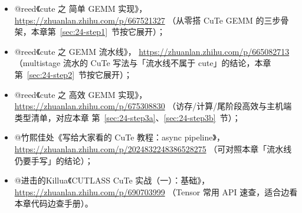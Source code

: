 \begin{itemize}
  \item @reed《cute 之 简单 GEMM 实现》，
        \url{https://zhuanlan.zhihu.com/p/667521327}
        （从零搭 CuTe GEMM 的三步骨架，本章第~\ref{sec:24-step1}~节按它展开）；
  \item @reed《cute 之 GEMM 流水线》，
        \url{https://zhuanlan.zhihu.com/p/665082713}
        （multistage 流水的 CuTe 写法与「流水线不属于 cute」的结论，本章
        第~\ref{sec:24-step2}~节按它展开）；
  \item @reed《cute 之 高效 GEMM 实现》，
        \url{https://zhuanlan.zhihu.com/p/675308830}
        （访存/计算/尾阶段高效与主机端类型清单，对应本章
        第~\ref{sec:24-step3a}、\ref{sec:24-step3b}~节）；
  \item @竹熙佳处《写给大家看的 CuTe 教程：async pipeline》，
        \url{https://zhuanlan.zhihu.com/p/2024832248386528275}
        （可对照本章「流水线仍要手写」的结论）；
  \item @进击的Killua《CUTLASS CuTe 实战（一）：基础》，
        \url{https://zhuanlan.zhihu.com/p/690703999}
        （Tensor 常用 API 速查，适合边看本章代码边查手册）。
\end{itemize}
